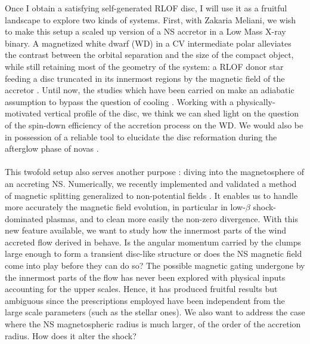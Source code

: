 \documentclass[a4paper,12pt,onecolumn]{article}
\begin{document}
\indent Once I obtain a satisfying self-generated RLOF disc, I will use it as a fruitful landscape to explore two kinds of systems. First, with Zakaria Meliani, we wish to make this setup a scaled up version of a NS accretor in a Low Mass X-ray binary. A magnetized white dwarf (WD) in a CV intermediate polar alleviates the contrast between the orbital separation and the size of the compact object, while still retaining most of the geometry of the system: a RLOF donor star feeding a disc truncated in its innermost regions by the magnetic field of the accretor \citep{Ghosh1977}. Until now, the studies which have been carried on make an adiabatic assumption to bypass the question of cooling \citep{Ju2017}. Working with a physically-motivated vertical profile of the disc, we think we can shed light on the question of the spin-down efficiency of the accretion process on the WD. We would also be in possession of a reliable tool to elucidate the disc reformation during the afterglow phase of novas \citep{Ness2012}.\\ \\
\indent This twofold setup also serves another purpose : diving into the magnetosphere of an accreting NS. Numerically, we recently implemented and validated a method of magnetic splitting generalized to non-potential fields \citep{Xia2017}. It enables us to handle more accurately the magnetic field evolution, in particular in low-$\beta$ shock-dominated plasmas, and to clean more easily the non-zero divergence. With this new feature available, we want to study how the innermost parts of the wind accreted flow derived in \cite{ElMellah} behave. Is the angular momentum carried by the clumps large enough to form a transient disc-like structure or does the NS magnetic field come into play before they can do so? The possible magnetic gating undergone by the innermost parts of the flow has never been explored with physical inputs accounting for the upper scales. Hence, it has produced fruitful results but ambiguous since the prescriptions employed have been independent from the large scale parameters (such as the stellar ones). We also want to address the case where the NS magnetospheric radius is much larger, of the order of the accretion radius. How does it alter the shock?  \\ \\

\end{document}
